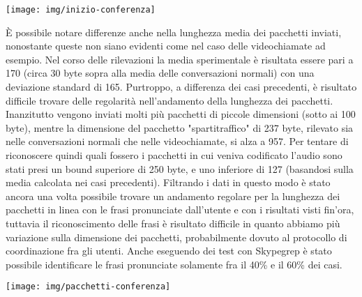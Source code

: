 \begin{center}
\begin{minipage}{\linewidth}
\texttt{[image: img/inizio-conferenza]}
\end{minipage}
\end{center}

È possibile notare differenze anche nella lunghezza media dei pacchetti inviati, nonostante queste non siano evidenti come nel caso delle videochiamate ad esempio.\newline
Nel corso delle rilevazioni la media sperimentale è risultata essere pari a 170 (circa 30 byte sopra alla media delle conversazioni normali) con una deviazione standard di 165. Purtroppo, a differenza dei casi precedenti, è risultato difficile trovare delle regolarità nell'andamento della lunghezza dei pacchetti. Inanzitutto vengono inviati molti più pacchetti di piccole dimensioni (sotto ai 100 byte), mentre la dimensione del pacchetto "spartitraffico" di 237 byte, rilevato sia nelle conversazioni normali che nelle videochiamate, si alza a 957.\newline
Per tentare di riconoscere quindi quali fossero i pacchetti in cui veniva codificato l'audio sono stati presi un bound superiore di 250 byte, e uno inferiore di 127 (basandosi sulla media calcolata nei casi precedenti). Filtrando i dati in questo modo è stato ancora una volta possibile trovare un andamento regolare per la lunghezza dei pacchetti in linea con le frasi pronunciate dall'utente e con i risultati visti fin'ora, tuttavia il riconoscimento delle frasi è risultato difficile in quanto abbiamo più variazione sulla dimensione dei pacchetti, probabilmente dovuto al protocollo di coordinazione fra gli utenti. Anche eseguendo dei test con Skypegrep è stato possibile identificare le frasi pronunciate solamente fra il 40\% e il 60\% dei casi.

\begin{center}
\begin{minipage}{\linewidth}
\texttt{[image: img/pacchetti-conferenza]}
\end{minipage}
\end{center}

